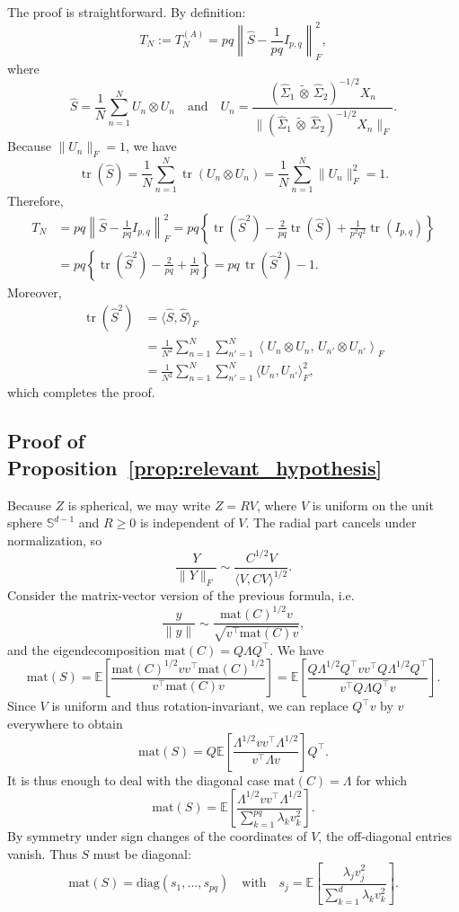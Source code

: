 \documentclass[12pt]{article}
\newcommand{\E}{\mathbb{E}}
\newcommand{\mat}{\mathrm{mat}}
\newcommand{\ot}{\,\tilde\otimes\,}
\begin{document}
The proof is straightforward. By definition:
\[
T_N := T_N^{(A)} = pq \left\| \widehat{S} - \frac{1}{pq} I_{p,q}\right\|_F^2,
\]
where
\[
\widehat{S} = \frac{1}{N}\sum_{n=1}^N U_n \otimes U_n \quad \text{and} \quad U_n = \frac{(\widehat{\Sigma}_1 \ot \widehat{\Sigma}_2)^{-1/2}X_n}{\| (\widehat{\Sigma}_1 \ot \widehat{\Sigma}_2)^{-1/2}X_n \|_F}.
\]
Because \(\|U_n\|_F=1\), we have
\[
\operatorname{tr}(\widehat S)
=
\frac{1}{N}\sum_{n=1}^N \operatorname{tr}(U_n\otimes U_n)
=
\frac{1}{N}\sum_{n=1}^N \|U_n\|_F^2
=
1.
\]
Therefore,
\[
\begin{aligned}
T_N
&=
pq\left\|
\widehat S-\frac{1}{pq}I_{p,q}
\right\|_F^2 =
pq\left\{
\operatorname{tr}(\widehat S^2)
-\frac{2}{pq}\operatorname{tr}(\widehat S)
+\frac{1}{p^2q^2}\operatorname{tr}(I_{p,q})
\right\} \\
&=
pq\left\{
\operatorname{tr}(\widehat S^2)
-\frac{2}{pq}
+\frac{1}{pq}
\right\} =
pq\,\operatorname{tr}(\widehat S^2)-1.
\end{aligned}
\]
Moreover,
\[
\begin{aligned}
\operatorname{tr}(\widehat S^2)
&=
\langle \widehat S,\widehat S\rangle_F \\
&=
\frac{1}{N^2}
\sum_{n=1}^N
\sum_{n'=1}^N
\left\langle
U_n\otimes U_n,\,
U_{n'}\otimes U_{n'}
\right\rangle_F \\
&=
\frac{1}{N^2}
\sum_{n=1}^N
\sum_{n'=1}^N
\langle U_n,U_{n'}\rangle_F^2,
\end{aligned}
\]
which completes the proof.



\subsection{Proof of Proposition~\ref{prop:relevant_hypothesis}}

Because \(Z\) is spherical, we may write \(Z=RV\), where \(V\) is uniform on the unit sphere \(\mathbb S^{d-1}\) and \(R\ge 0\) is independent of \(V\). The radial part cancels under normalization, so
\[
	\frac{Y}{\|Y\|_F}
	\sim
	\frac{C^{1/2}V}{\langle V, C V\rangle^{1/2}}.
\]
Consider the matrix-vector version of the previous formula, i.e.
\[
	\frac{y}{\|y\|}
	\sim
	\frac{\mat(C)^{1/2}v}{\sqrt{v^\top \mat(C) v}},
\]
and the eigendecomposition $\mat(C) = Q \Lambda Q^\top$. We have
\[
\mat(S)
	=
	\E\left[
	\frac{\mat(C)^{1/2}vv^\top \mat(C)^{1/2}}{v^\top \mat(C) v}
	\right]
    = \E\left[ \frac{Q \Lambda^{1/2}Q^\top v v^\top Q \Lambda^{1/2}Q^\top}{v^\top Q \Lambda Q^\top v} \right].
\]
Since $V$ is uniform and thus rotation-invariant, we can replace $Q^\top v$ by $v$ everywhere to obtain
\[
\mat(S) = Q \E\left[ \frac{\Lambda^{1/2}v v^\top \Lambda^{1/2}}{v^\top \Lambda v} \right] Q^\top.
\]
It is thus enough to deal with the diagonal case $\mat(C)=\Lambda$ for which
\[
\mat(S) = \E\left[ \frac{\Lambda^{1/2}v v^\top \Lambda^{1/2}}{\sum_{k=1}^{pq} \lambda_k v_k^2} \right].
\]
By symmetry under sign changes of the coordinates of $V$, the off-diagonal entries vanish. Thus $S$ must be diagonal:
	\[
	\mat(S)=\mathrm{diag}(s_1,\dots,s_{pq})
	\quad\text{with}\quad
	s_j
	=
	\E\!\left[
	\frac{\lambda_j v_j^2}{\sum_{k=1}^d \lambda_k v_k^2}
	\right].
	\]
	
\end{document}
